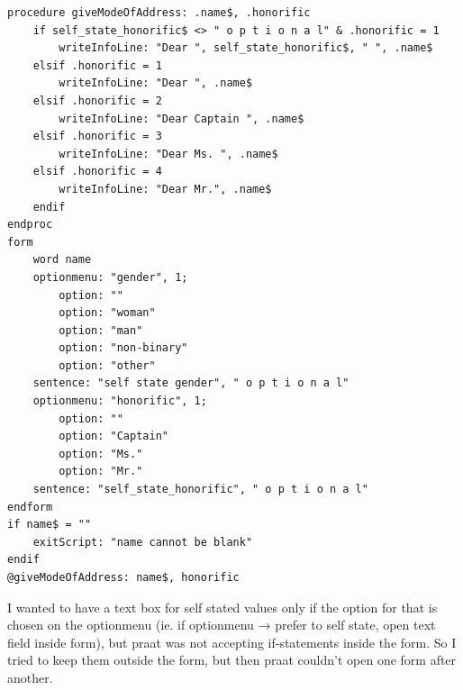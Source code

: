 \documentclass[12pt, english]{article}
\begin{document}
\begin{lstlisting}
procedure giveModeOfAddress: .name$, .honorific
	if self_state_honorific$ <> " o p t i o n a l" & .honorific = 1
		writeInfoLine: "Dear ", self_state_honorific$, " ", .name$
	elsif .honorific = 1
		writeInfoLine: "Dear ", .name$ 
	elsif .honorific = 2
		writeInfoLine: "Dear Captain ", .name$ 
	elsif .honorific = 3
		writeInfoLine: "Dear Ms. ", .name$ 
	elsif .honorific = 4
		writeInfoLine: "Dear Mr.", .name$ 
	endif
endproc
form
	word name
	optionmenu: "gender", 1;
		option: ""
		option: "woman"
		option: "man"
		option: "non-binary"
		option: "other"
	sentence: "self state gender", " o p t i o n a l"
	optionmenu: "honorific", 1;
		option: ""
		option: "Captain"
		option: "Ms."
		option: "Mr."
	sentence: "self_state_honorific", " o p t i o n a l"
endform
if name$ = ""
	exitScript: "name cannot be blank"
endif
@giveModeOfAddress: name$, honorific
\end{lstlisting}
\vspace{5pt}
I wanted to have a text box for self stated values only if the option for that is chosen on the optionmenu (ie. if optionmenu → prefer to self state, open text field inside form), but praat was not accepting if-statements inside the form. So I tried to keep them outside the form, but then praat couldn't open one form after another.

\vspace{10pt}
\end{document}
